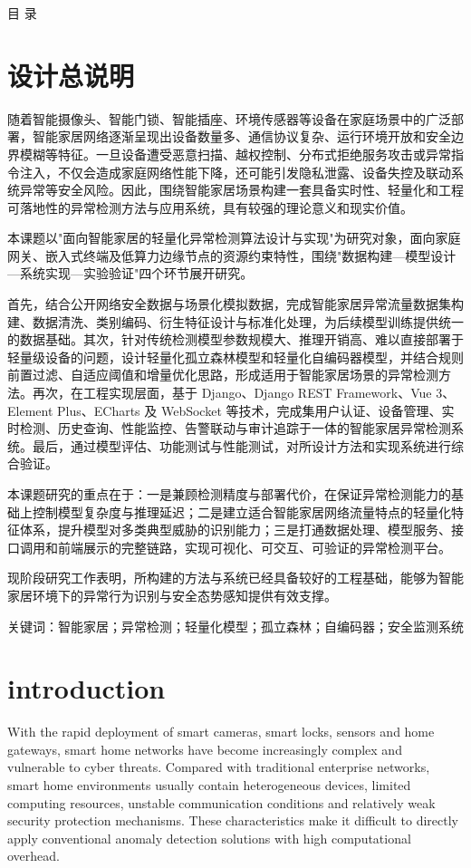 \documentclass[12pt, a4paper, twoside]{ctexart}
\begin{document}
目  录


\chapter{设计总说明}

随着智能摄像头、智能门锁、智能插座、环境传感器等设备在家庭场景中的广泛部署，智能家居网络逐渐呈现出设备数量多、通信协议复杂、运行环境开放和安全边界模糊等特征。一旦设备遭受恶意扫描、越权控制、分布式拒绝服务攻击或异常指令注入，不仅会造成家庭网络性能下降，还可能引发隐私泄露、设备失控及联动系统异常等安全风险。因此，围绕智能家居场景构建一套具备实时性、轻量化和工程可落地性的异常检测方法与应用系统，具有较强的理论意义和现实价值。

本课题以"面向智能家居的轻量化异常检测算法设计与实现"为研究对象，面向家庭网关、嵌入式终端及低算力边缘节点的资源约束特性，围绕"数据构建—模型设计—系统实现—实验验证"四个环节展开研究。

首先，结合公开网络安全数据与场景化模拟数据，完成智能家居异常流量数据集构建、数据清洗、类别编码、衍生特征设计与标准化处理，为后续模型训练提供统一的数据基础。其次，针对传统检测模型参数规模大、推理开销高、难以直接部署于轻量级设备的问题，设计轻量化孤立森林模型和轻量化自编码器模型，并结合规则前置过滤、自适应阈值和增量优化思路，形成适用于智能家居场景的异常检测方法。再次，在工程实现层面，基于 Django、Django REST Framework、Vue 3、Element Plus、ECharts 及 WebSocket 等技术，完成集用户认证、设备管理、实时检测、历史查询、性能监控、告警联动与审计追踪于一体的智能家居异常检测系统。最后，通过模型评估、功能测试与性能测试，对所设计方法和实现系统进行综合验证。

本课题研究的重点在于：一是兼顾检测精度与部署代价，在保证异常检测能力的基础上控制模型复杂度与推理延迟；二是建立适合智能家居网络流量特点的轻量化特征体系，提升模型对多类典型威胁的识别能力；三是打通数据处理、模型服务、接口调用和前端展示的完整链路，实现可视化、可交互、可验证的异常检测平台。

现阶段研究工作表明，所构建的方法与系统已经具备较好的工程基础，能够为智能家居环境下的异常行为识别与安全态势感知提供有效支撑。

关键词：智能家居；异常检测；轻量化模型；孤立森林；自编码器；安全监测系统


\chapter{introduction}

With the rapid deployment of smart cameras, smart locks, sensors and home gateways, smart home networks have become increasingly complex and vulnerable to cyber threats. Compared with traditional enterprise networks, smart home environments usually contain heterogeneous devices, limited computing resources, unstable communication conditions and relatively weak security protection mechanisms. These characteristics make it difficult to directly apply conventional anomaly detection solutions with high computational overhead.
\end{document}
